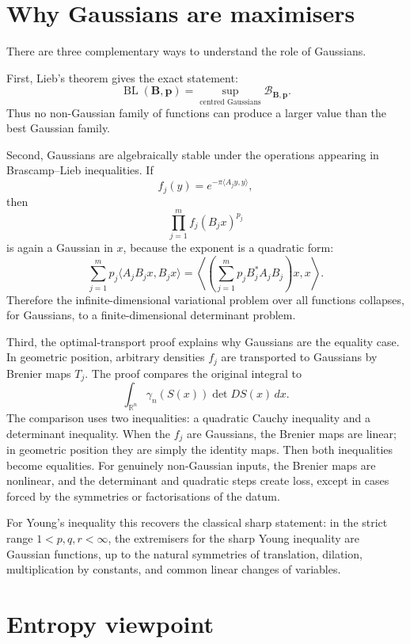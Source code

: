 \documentclass[11pt]{article}
\DeclareMathOperator{\BL}{BL}
\begin{document}
\section{Why Gaussians are maximisers}

There are three complementary ways to understand the role of Gaussians.

First, Lieb's theorem gives the exact statement:
\[
        \BL(\mathbf B,\mathbf p)
        =
        \sup_{\text{centred Gaussians}}
        \mathcal B_{\mathbf B,\mathbf p}.
\]
Thus no non-Gaussian family of functions can produce a larger value than the
best Gaussian family.

Second, Gaussians are algebraically stable under the operations appearing in
Brascamp--Lieb inequalities. If
\[
        f_j(y)=e^{-\pi\langle A_jy,y\rangle},
\]
then
\[
        \prod_{j=1}^m f_j(B_jx)^{p_j}
\]
is again a Gaussian in \(x\), because the exponent is a quadratic form:
\[
        \sum_{j=1}^m p_j\langle A_jB_jx,B_jx\rangle
        =
        \left\langle
        \left(\sum_{j=1}^m p_jB_j^*A_jB_j\right)x,x
        \right\rangle.
\]
Therefore the infinite-dimensional variational problem over all functions
collapses, for Gaussians, to a finite-dimensional determinant problem.

Third, the optimal-transport proof explains why Gaussians are the equality
case. In geometric position, arbitrary densities \(f_j\) are transported to
Gaussians by Brenier maps \(T_j\). The proof compares the original integral to
\[
        \int_{\mathbb R^n}\gamma_n(S(x))\det DS(x)\,dx.
\]
The comparison uses two inequalities: a quadratic Cauchy inequality and a
determinant inequality. When the \(f_j\) are Gaussians, the Brenier maps are
linear; in geometric position they are simply the identity maps. Then both
inequalities become equalities. For genuinely non-Gaussian inputs, the Brenier
maps are nonlinear, and the determinant and quadratic steps create loss, except
in cases forced by the symmetries or factorisations of the datum.

For Young's inequality this recovers the classical sharp statement: in the
strict range \(1<p,q,r<\infty\), the extremisers for the sharp Young inequality
are Gaussian functions, up to the natural symmetries of translation, dilation,
multiplication by constants, and common linear changes of variables.

\section{Entropy viewpoint}
\end{document}
